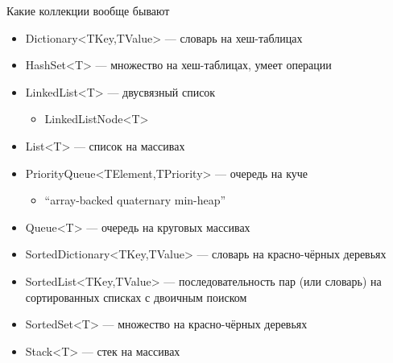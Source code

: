 \documentclass{../../slides-style}
\begin{document}
    \begin{frame}{Какие коллекции вообще бывают}
        \begin{small}
            \begin{itemize}
                \item Dictionary<TKey,TValue> --- словарь на хеш-таблицах
                \item HashSet<T> --- множество на хеш-таблицах, умеет операции
                \item LinkedList<T> --- двусвязный список
                \begin{itemize}
                    \item LinkedListNode<T>
                \end{itemize}
                \item List<T> --- список на массивах
                \item PriorityQueue<TElement,TPriority> --- очередь на куче
                \begin{itemize}
                    \item \enquote{array-backed quaternary min-heap}
                \end{itemize}
                \item Queue<T> --- очередь на круговых массивах
                \item SortedDictionary<TKey,TValue> --- словарь на красно-чёрных деревьях
                \item SortedList<TKey,TValue> --- последовательность пар (или словарь) на сортированных списках с двоичным поиском
                \item SortedSet<T> --- множество на красно-чёрных деревьях
                \item Stack<T> --- стек на массивах
            \end{itemize}
        \end{small}
    \end{frame}
\end{document}
